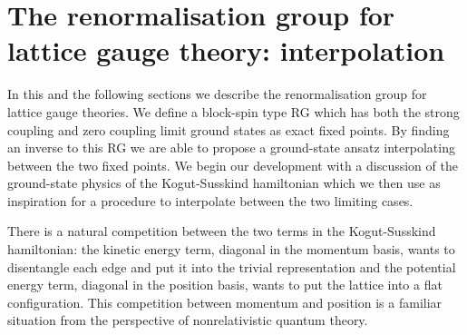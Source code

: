 \documentclass[twocolumn,lengthcheck,superscriptaddress]{revtex4-1}
\theoremstyle{definition}
\theoremstyle{remark}
\begin{document}
\section{The renormalisation group for lattice gauge theory: interpolation}
In this and the following sections we describe the renormalisation group for lattice gauge theories. We define a block-spin type RG which has both the strong coupling and zero coupling limit ground states as exact fixed points.  By finding an inverse to this RG we are able to propose a ground-state ansatz interpolating between the two fixed points. We begin our development with a discussion of the ground-state physics of the Kogut-Susskind hamiltonian which we then use as inspiration for a procedure to interpolate between the two limiting cases.

There is a natural competition between the two terms in the Kogut-Susskind hamiltonian: the kinetic energy term, diagonal in the momentum basis, wants to disentangle each edge and put it into the trivial representation and the potential energy term, diagonal in the position basis, wants to put the lattice into a flat configuration. This competition between momentum and position is a familiar situation from the perspective of nonrelativistic quantum theory.



\end{document}
